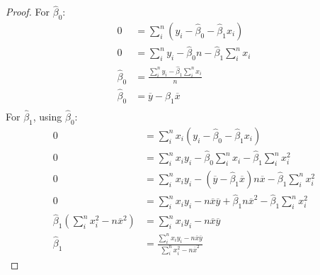\documentclass{article}
\begin{document}
\begin{proof}
    For \(\hat{\beta}_0\):
    \begin{align*}
        0             & = \sum_i^n \left( y_i - \hat{\beta}_0 - \hat{\beta}_1 x_i \right) \\
        0             & = \sum_i^n y_i - \hat{\beta}_0n - \hat{\beta}_1 \sum_i^n x_i      \\
        \hat{\beta}_0 & = \frac{\sum_i^n y_i - \hat{\beta}_1 \sum_i^n x_i}{n}             \\
        \hat{\beta}_0 & = \overline{y} - \hat{\beta}_1\overline{x}                        \\
    \end{align*}
    For \(\hat{\beta}_1\), using \(\hat{\beta}_0\):
    \begin{align*}
        0                                                              & = \sum_i^n x_i \left( y_i - \hat{\beta}_0 - \hat{\beta}_1 x_i \right)                                                      \\
        0                                                              & = \sum_i^n x_i y_i - \hat{\beta}_0 \sum_i^n x_i - \hat{\beta}_1 \sum_i^n x_i^2                                             \\
        0                                                              & = \sum_i^n x_i y_i - \left( \overline{y} - \hat{\beta}_1\overline{x} \right) n \overline{x} - \hat{\beta}_1 \sum_i^n x_i^2 \\
        0                                                              & = \sum_i^n x_i y_i - n \overline{x} \overline{y} + \hat{\beta}_1 n \overline{x}^2 - \hat{\beta}_1 \sum_i^n x_i^2           \\
        \hat{\beta}_1 \left( \sum_i^n x_i^2 - n \overline{x}^2 \right) & = \sum_i^n x_i y_i - n \overline{x} \overline{y}                                                                           \\
        \hat{\beta}_1                                                  & = \frac{\sum_i^n x_i y_i - n \overline{x} \overline{y}}{\sum_i^n x_i^2 - n \overline{x}^2}
    \end{align*}
\end{proof}
\end{document}
